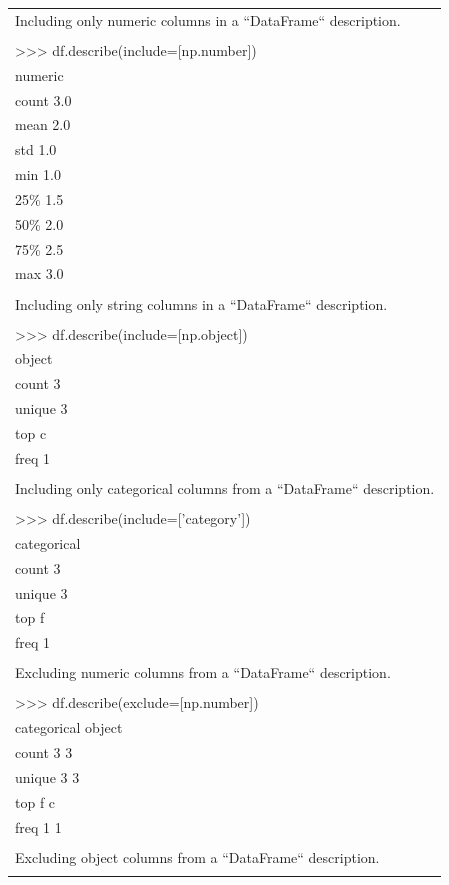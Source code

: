 \documentclass[11pt]{article}
\begin{document}
\begin{enumerate}
\begin{enumerate}
\begin{enumerate}
\begin{center}
\begin{tabular}{l}
Including only numeric columns in a ``DataFrame`` description.\\
\\
>>> df.describe(include=[np.number])\\
numeric\\
count      3.0\\
mean       2.0\\
std        1.0\\
min        1.0\\
25\%        1.5\\
50\%        2.0\\
75\%        2.5\\
max        3.0\\
\\
Including only string columns in a ``DataFrame`` description.\\
\\
>>> df.describe(include=[np.object])\\
object\\
count       3\\
unique      3\\
top         c\\
freq        1\\
\\
Including only categorical columns from a ``DataFrame`` description.\\
\\
>>> df.describe(include=['category'])\\
categorical\\
count            3\\
unique           3\\
top              f\\
freq             1\\
\\
Excluding numeric columns from a ``DataFrame`` description.\\
\\
>>> df.describe(exclude=[np.number])\\
categorical object\\
count            3      3\\
unique           3      3\\
top              f      c\\
freq             1      1\\
\\
Excluding object columns from a ``DataFrame`` description.\\
\\

\end{tabular}
\end{center}
\end{enumerate}
\end{enumerate}
\end{enumerate}
\end{document}
